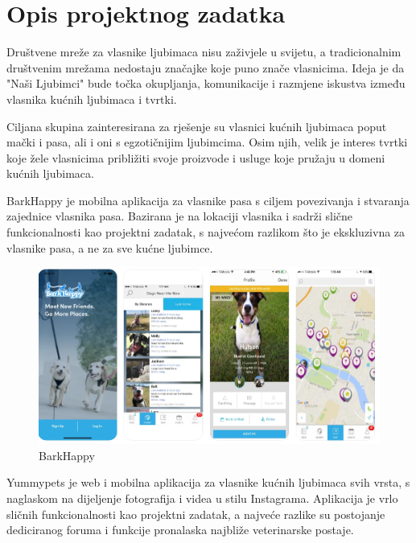 \chapter{Opis projektnog zadatka}
		
		\par Društvene mreže za vlasnike ljubimaca nisu zaživjele u svijetu, a tradicionalnim društvenim mrežama nedostaju značajke koje puno znače vlasnicima. Ideja je da "Naši Ljubimci" bude točka okupljanja, komunikacije i razmjene iskustva između vlasnika kućnih ljubimaca i tvrtki.
		\par Ciljana skupina zainteresirana za rješenje su vlasnici kućnih ljubimaca poput mački i pasa, ali i oni s egzotičnijim ljubimcima. Osim njih, velik je interes tvrtki koje žele vlasnicima približiti svoje proizvode i usluge koje pružaju u domeni kućnih ljubimaca.
		\par BarkHappy je mobilna aplikacija za vlasnike pasa s ciljem povezivanja i stvaranja zajednice vlasnika pasa. Bazirana je na lokaciji vlasnika i sadrži slične funkcionalnosti kao projektni zadatak, s najvećom razlikom što je ekskluzivna za vlasnike pasa, a ne za sve kućne ljubimce.
		
		\begin{figure}[H]
			\includegraphics[scale=0.4]{slike/BarkHappy.PNG} %
			\centering
			\caption{BarkHappy}
			\label{fig:promjene}
		\end{figure}
	
		\par Yummypets je web i mobilna aplikacija za vlasnike kućnih ljubimaca svih vrsta, s naglaskom na dijeljenje fotografija i videa u stilu Instagrama. Aplikacija je vrlo sličnih funkcionalnosti kao projektni zadatak, a najveće razlike su postojanje dediciranog foruma i funkcije pronalaska najbliže veterinarske postaje.
		
